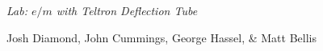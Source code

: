 {\LARGE {\em \noindent Lab: $e/m$ with Teltron Deflection Tube}}

\large{\noindent Josh Diamond,  John Cummings, George Hassel, \& Matt Bellis}
